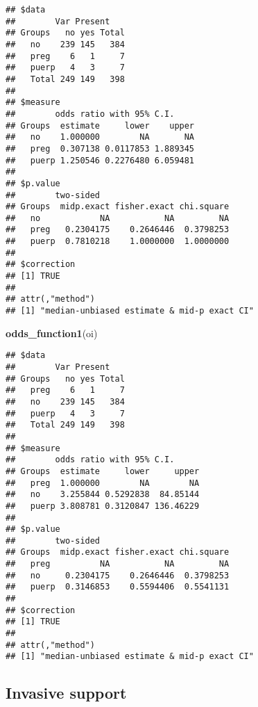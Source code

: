 \documentclass[
]{article}
\newenvironment{Shaded}{\begin{snugshade}}{\end{snugshade}}
\newcommand{\KeywordTok}[1]{\textcolor[rgb]{0.13,0.29,0.53}{\textbf{#1}}}
\newcommand{\NormalTok}[1]{#1}
\newcommand{\OperatorTok}[1]{\textcolor[rgb]{0.81,0.36,0.00}{\textbf{#1}}}
\newcommand{\StringTok}[1]{\textcolor[rgb]{0.31,0.60,0.02}{#1}}
\begin{document}
\begin{Shaded}
\end{Shaded}

\begin{verbatim}
## $data
##        Var Present
## Groups   no yes Total
##   no    239 145   384
##   preg    6   1     7
##   puerp   4   3     7
##   Total 249 149   398
## 
## $measure
##        odds ratio with 95% C.I.
## Groups  estimate     lower    upper
##   no    1.000000        NA       NA
##   preg  0.307138 0.0117853 1.889345
##   puerp 1.250546 0.2276480 6.059481
## 
## $p.value
##        two-sided
## Groups  midp.exact fisher.exact chi.square
##   no            NA           NA         NA
##   preg   0.2304175    0.2646446  0.3798253
##   puerp  0.7810218    1.0000000  1.0000000
## 
## $correction
## [1] TRUE
## 
## attr(,"method")
## [1] "median-unbiased estimate & mid-p exact CI"
\end{verbatim}

\begin{Shaded}
\begin{Highlighting}[]
\KeywordTok{odds_function1}\NormalTok{(oi)}
\end{Highlighting}
\end{Shaded}

\begin{verbatim}
## $data
##        Var Present
## Groups   no yes Total
##   preg    6   1     7
##   no    239 145   384
##   puerp   4   3     7
##   Total 249 149   398
## 
## $measure
##        odds ratio with 95% C.I.
## Groups  estimate     lower     upper
##   preg  1.000000        NA        NA
##   no    3.255844 0.5292838  84.85144
##   puerp 3.808781 0.3120847 136.46229
## 
## $p.value
##        two-sided
## Groups  midp.exact fisher.exact chi.square
##   preg          NA           NA         NA
##   no     0.2304175    0.2646446  0.3798253
##   puerp  0.3146853    0.5594406  0.5541131
## 
## $correction
## [1] TRUE
## 
## attr(,"method")
## [1] "median-unbiased estimate & mid-p exact CI"
\end{verbatim}

\hypertarget{invasive-support}{%
\subsection{Invasive support}\label{invasive-support}}
\end{document}
